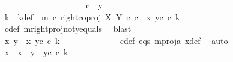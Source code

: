\begin{isabellebody}
\ \ \ \ \ \ \ \ \isamarkupfalse%
\isanewline
\ \ \ \ \ \ \ \ \ \ \isamarkupfalse%
\ {\isachardoublequoteopen}c\ {\isasymnoteq}\ y{}{\isachardoublequoteclose}\ \ \ \ \ \ \ \isanewline
\ \ \ \ \ \ \ \ \ \ \isamarkupfalse%
\ \isamarkupfalse%
\ k\ \ k{\isacharunderscore}{\kern0pt}def{\isacharcolon}{\kern0pt}\ \ {\isachardoublequoteopen}m\ {\isasymcirc}\isactrlsub c\ right{\isacharunderscore}{\kern0pt}coproj\ X\ Y\ {\isasymcirc}\isactrlsub c\ c\ {\isacharequal}{\kern0pt}\ {\isasymlangle}x{}{\isacharcomma}{\kern0pt}\ y{}\isactrlsup c\ {\isasymcirc}\isactrlsub c\ k{\isasymrangle}{\isachardoublequoteclose}\isanewline
\ \ \ \ \ \ \ \ \ \ \ \ \isamarkupfalse%
\ c{\isacharunderscore}{\kern0pt}def\ m{\isacharunderscore}{\kern0pt}rightproj{\isacharunderscore}{\kern0pt}not{\isacharunderscore}{\kern0pt}y{}{\isacharunderscore}{\kern0pt}equals\ \isamarkupfalse%
\ blast\ \ \ \ \ \ \ \ \ \ \ \ \ \ \ \ \ \ \ \ \ \isanewline
\ \ \ \ \ \ \ \ \ \ \isamarkupfalse%
\ \isamarkupfalse%
\ {\isachardoublequoteopen}{\isasymlangle}x{\isacharcomma}{\kern0pt}\ y{}{\isasymrangle}\ {\isacharequal}{\kern0pt}\ {\isasymlangle}x{}{\isacharcomma}{\kern0pt}\ y{}\isactrlsup c\ {\isasymcirc}\isactrlsub c\ k{\isasymrangle}{\isachardoublequoteclose}\isanewline
\ \ \ \ \ \ \ \ \ \ \ \ \isamarkupfalse%
\ c{\isacharunderscore}{\kern0pt}def\ eqs\ m{\isacharunderscore}{\kern0pt}proj{\isacharunderscore}{\kern0pt}a\ x{\isacharunderscore}{\kern0pt}def\ \isamarkupfalse%
\ auto\isanewline
\ \ \ \ \ \ \ \ \ \ \isamarkupfalse%
\ \isamarkupfalse%
\ {\isachardoublequoteopen}{\isacharparenleft}{\kern0pt}x\ {\isacharequal}{\kern0pt}\ x{}{\isacharparenright}{\kern0pt}\ {\isasymand}\ {\isacharparenleft}{\kern0pt}y{}\ {\isacharequal}{\kern0pt}\ y{}\isactrlsup c\ {\isasymcirc}\isactrlsub c\ k{\isacharparenright}{\kern0pt}{\isachardoublequoteclose}\isanewline
\ \ \ \ \ \ \ \ \ \ \ \ \isamarkupfalse%

\end{isabellebody}
